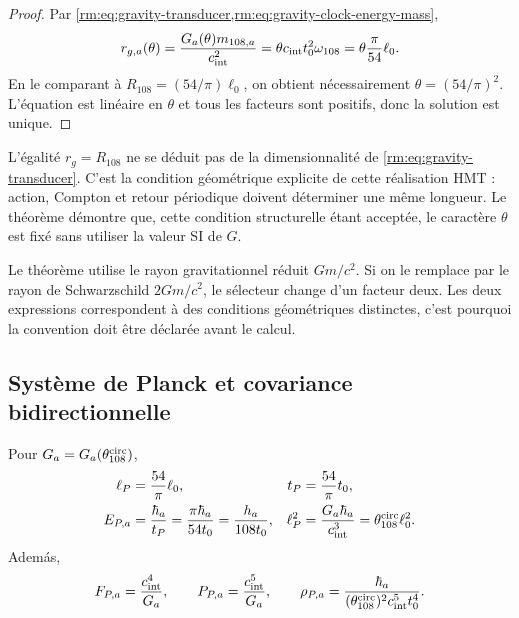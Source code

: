 \begin{proof}
Par \cref{rm:eq:gravity-transducer,rm:eq:gravity-clock-energy-mass},
\[
r_{g,a}(\theta)
=\frac{G_a(\theta)m_{108,a}}{c_{\rm int}^2}
=\theta c_{\rm int}t_0^2\omega_{108}
=\theta\frac{\pi}{54}\ell_0.
\]
En le comparant à
\(R_{108}=(54/\pi)\ell_0\), on obtient nécessairement
\(\theta=(54/\pi)^2\). L'équation est linéaire en \(\theta\) et tous les
facteurs sont positifs, donc la solution est unique.
\end{proof}

L'égalité \(r_g=R_{108}\) ne se déduit pas de la dimensionnalité de
\cref{rm:eq:gravity-transducer}. C'est la condition géométrique explicite de cette
réalisation HMT : action, Compton et retour périodique doivent déterminer une même
longueur. Le théorème démontre que, cette condition structurelle étant acceptée, le
caractère \(\theta\) est fixé sans utiliser la valeur SI de \(G\).

\begin{remark}
Le théorème utilise le rayon gravitationnel réduit \(Gm/c^2\). Si on le remplace
par le rayon de Schwarzschild \(2Gm/c^2\), le sélecteur change d'un facteur
deux. Les deux expressions correspondent à des conditions géométriques distinctes,
c'est pourquoi la convention doit être déclarée avant le calcul.
\end{remark}

\subsection{Système de Planck et covariance bidirectionnelle}

\begin{corollary}
\label{rm:cor:gravity-planck-family}
Pour \(G_a=G_a(\theta_{108}^{\rm circ})\),
\begin{align}
\ell_P&=\frac{54}{\pi}\ell_0,
&t_P&=\frac{54}{\pi}t_0,
\label{rm:eq:gravity-planck-length-time}\\
E_{P,a}&=\frac{\hbar_a}{t_P}
=\frac{\pi\hbar_a}{54t_0}
=\frac{h_a}{108t_0},
&\ell_P^2&=\frac{G_a\hbar_a}{c_{\rm int}^3}
=\theta_{108}^{\rm circ}\ell_0^2.
\label{rm:eq:gravity-planck-energy-area}
\end{align}
Adem\'as,
\begin{equation}
\label{rm:eq:gravity-planck-force-power-density}
F_{P,a}=\frac{c_{\rm int}^4}{G_a},
\qquad
P_{P,a}=\frac{c_{\rm int}^5}{G_a},
\qquad
\rho_{P,a}=\frac{\hbar_a}
{(\theta_{108}^{\rm circ})^2c_{\rm int}^5t_0^4}.
\end{equation}
\end{corollary}

